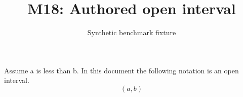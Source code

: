 \documentclass{article}
\title{M18: Authored open interval}
\author{Synthetic benchmark fixture}
\date{}
\begin{document}
\maketitle
Assume a is less than b. In this document the following notation is an open interval.
\[(a,b)\]
\end{document}

